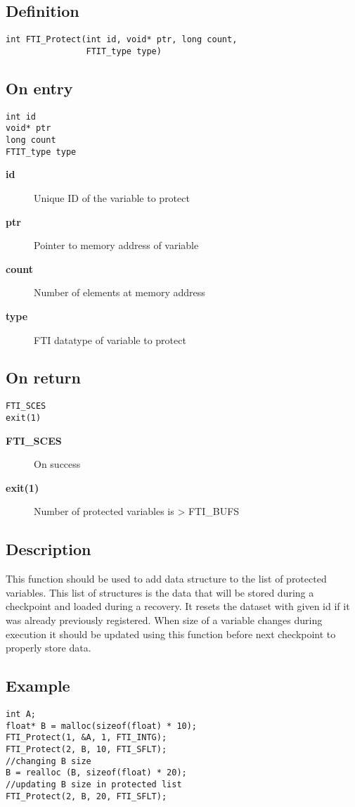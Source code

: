 \documentclass{refrep}
\begin{document}
\subsection*{Definition}
\begin{lstlisting}[frame=single]
int FTI_Protect(int id, void* ptr, long count,
                FTIT_type type)
\end{lstlisting}
\subsection*{On entry}
\begin{lstlisting}[frame=single]
int id
void* ptr
long count
FTIT_type type
\end{lstlisting}
\begin{description}
\item[\textbf{id}] Unique ID of the variable to protect
\item[\textbf{ptr}] Pointer to memory address of variable
\item[\textbf{count}] Number of elements at memory address
\item[\textbf{type}] FTI datatype of variable to protect
\end{description}
\subsection*{On return}
\begin{lstlisting}[frame=single]
FTI_SCES
exit(1)
\end{lstlisting}
\begin{description}
\item[\textbf{FTI\_SCES}] On success
\item[\textbf{exit(1)}] Number of protected variables is > FTI\_BUFS
\end{description}
\subsection*{Description}
This function should be used to add data structure to the list of protected variables. This list of structures is the data that will be stored during a checkpoint and loaded during a recovery. It resets the dataset with given id if it was already previously registered. When size of a variable changes during execution it should be updated using this function before next checkpoint to properly store data.
\subsection*{Example}
\begin{center}
\begin{lstlisting}[frame=single]
int A;
float* B = malloc(sizeof(float) * 10);
FTI_Protect(1, &A, 1, FTI_INTG);
FTI_Protect(2, B, 10, FTI_SFLT);
//changing B size
B = realloc (B, sizeof(float) * 20);
//updating B size in protected list
FTI_Protect(2, B, 20, FTI_SFLT);
\end{lstlisting}
\end{center}
\newpage
\end{document}
